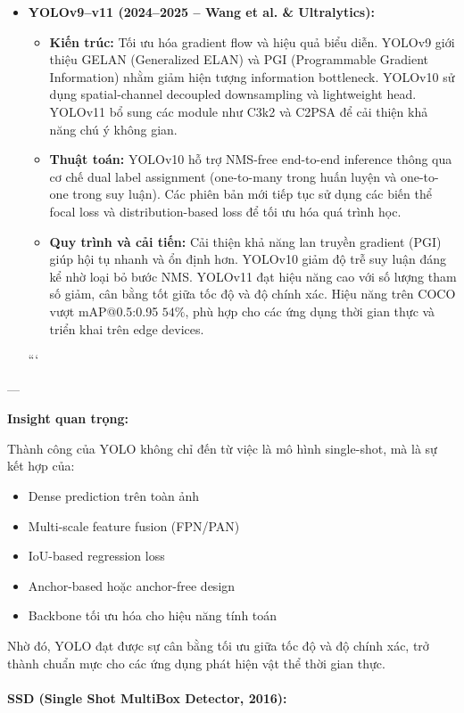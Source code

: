 \begin{itemize}
	\item \textbf{YOLOv9--v11 (2024--2025 -- Wang et al. \& Ultralytics):}
	\begin{itemize}
		\item \textbf{Kiến trúc:} Tối ưu hóa gradient flow và hiệu quả biểu diễn. YOLOv9 giới thiệu GELAN (Generalized ELAN) và PGI (Programmable Gradient Information) nhằm giảm hiện tượng information bottleneck. YOLOv10 sử dụng spatial-channel decoupled downsampling và lightweight head. YOLOv11 bổ sung các module như C3k2 và C2PSA để cải thiện khả năng chú ý không gian.
		
		\item \textbf{Thuật toán:} YOLOv10 hỗ trợ NMS-free end-to-end inference thông qua cơ chế dual label assignment (one-to-many trong huấn luyện và one-to-one trong suy luận). Các phiên bản mới tiếp tục sử dụng các biến thể focal loss và distribution-based loss để tối ưu hóa quá trình học.
		
		\item \textbf{Quy trình và cải tiến:} Cải thiện khả năng lan truyền gradient (PGI) giúp hội tụ nhanh và ổn định hơn. YOLOv10 giảm độ trễ suy luận đáng kể nhờ loại bỏ bước NMS. YOLOv11 đạt hiệu năng cao với số lượng tham số giảm, cân bằng tốt giữa tốc độ và độ chính xác. Hiệu năng trên COCO vượt mAP@0.5:0.95 $54\%$, phù hợp cho các ứng dụng thời gian thực và triển khai trên edge devices.
	\end{itemize}
	```
	
\end{itemize}


---

\textbf{Insight quan trọng:}

Thành công của YOLO không chỉ đến từ việc là mô hình single-shot, mà là sự kết hợp của:
\begin{itemize}
\item Dense prediction trên toàn ảnh
\item Multi-scale feature fusion (FPN/PAN)
\item IoU-based regression loss
\item Anchor-based hoặc anchor-free design
\item Backbone tối ưu hóa cho hiệu năng tính toán
\end{itemize}

Nhờ đó, YOLO đạt được sự cân bằng tối ưu giữa tốc độ và độ chính xác, trở thành chuẩn mực cho các ứng dụng phát hiện vật thể thời gian thực.


\paragraph{SSD (Single Shot MultiBox Detector, 2016):}

